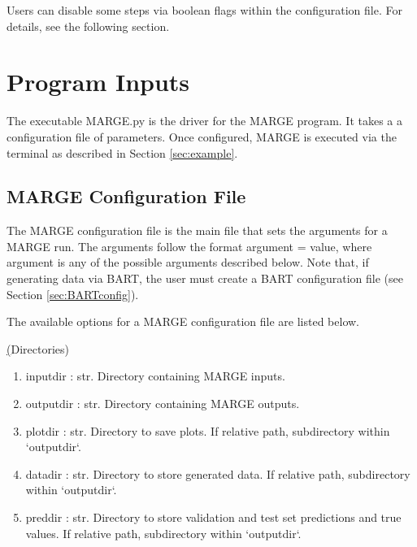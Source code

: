 \documentclass[letterpaper, 12pt]{article}
\begin{document}
\noindent Users can disable some steps via boolean flags within the configuration file.  
For details, see the following section.










\section{Program Inputs}
\label{sec:inputs}

The executable MARGE.py is the driver for the MARGE program. It takes a 
a configuration file of parameters.  Once configured, MARGE is executed via 
the terminal as described in Section \ref{sec:example}.


\subsection{MARGE Configuration File}
\label{sec:config}
The MARGE configuration file is the main file that sets the arguments for a 
MARGE run. The arguments follow the format {\ttb argument = value}, where 
{\ttb argument} is any of the possible arguments described below. Note that, 
if generating data via BART, the user must create a BART configuration file 
(see Section \ref{sec:BARTconfig}).

\noindent The available options for a MARGE configuration file are listed below.

\noindent \underline(Directories)
\begin{enumerate}
\item inputdir   : str.  Directory containing MARGE inputs.
\item outputdir  : str.  Directory containing MARGE outputs.
\item plotdir    : str.  Directory to save plots. 
                         If relative path, subdirectory within `outputdir`.
\item datadir    : str.  Directory to store generated data. 
                         If relative path, subdirectory within `outputdir`.
\item preddir    : str.  Directory to store validation and test set predictions and true values. 
                         If relative path, subdirectory within `outputdir`.
\end{enumerate}
\end{document}
